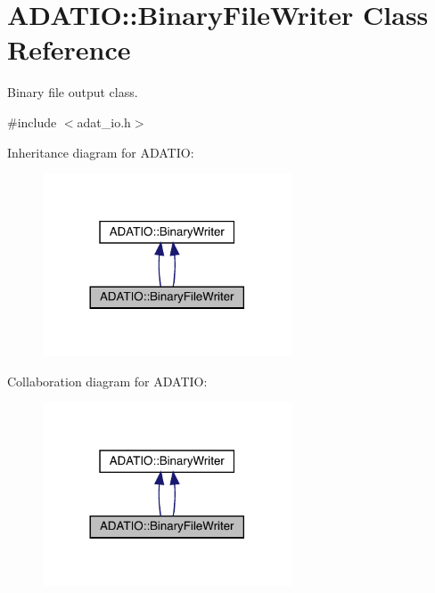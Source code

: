 \hypertarget{classADATIO_1_1BinaryFileWriter}{}\section{A\+D\+A\+T\+IO\+:\+:Binary\+File\+Writer Class Reference}
\label{classADATIO_1_1BinaryFileWriter}


Binary file output class.  




{\ttfamily \#include $<$adat\+\_\+io.\+h$>$}



Inheritance diagram for A\+D\+A\+T\+IO\+:\nopagebreak
\begin{figure}[H]
\begin{center}
\leavevmode
\includegraphics[width=209pt]{d1/d42/classADATIO_1_1BinaryFileWriter__inherit__graph}
\end{center}
\end{figure}


Collaboration diagram for A\+D\+A\+T\+IO\+:\nopagebreak
\begin{figure}[H]
\begin{center}
\leavevmode
\includegraphics[width=209pt]{d9/dce/classADATIO_1_1BinaryFileWriter__coll__graph}
\end{center}
\end{figure}
